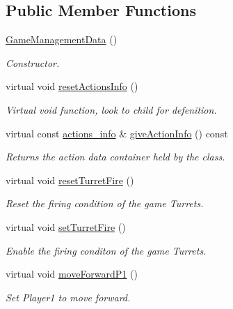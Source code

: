 \subsection*{Public Member Functions}
\begin{DoxyCompactItemize}
\item 
\hyperlink{classGameManagementData_a62ed683d4e02da56bda0507892a72041}{Game\-Management\-Data} ()
\begin{DoxyCompactList}\small\item\em Constructor. \end{DoxyCompactList}\item 
virtual void \hyperlink{classGameManagementData_ae49afd739e313caf0b5cd3799be1b125}{reset\-Actions\-Info} ()
\begin{DoxyCompactList}\small\item\em Virtual void function, look to child for defenition. \end{DoxyCompactList}\item 
virtual const \hyperlink{structactions__info}{actions\-\_\-info} \& \hyperlink{classGameManagementData_afa213f0d90a9d0878fae317457f5e851}{give\-Action\-Info} () const 
\begin{DoxyCompactList}\small\item\em Returns the action data container held by the class. \end{DoxyCompactList}\item 
virtual void \hyperlink{classGameManagementData_a2e9acf1ddddabee775dc106b478aa2e2}{reset\-Turret\-Fire} ()
\begin{DoxyCompactList}\small\item\em Reset the firing condition of the game Turrets. \end{DoxyCompactList}\item 
virtual void \hyperlink{classGameManagementData_aa3e5f9aaa99a44c4518933ad75b7ccd6}{set\-Turret\-Fire} ()
\begin{DoxyCompactList}\small\item\em Enable the firing conditon of the game Turrets. \end{DoxyCompactList}\item 
virtual void \hyperlink{classGameManagementData_a4ad4fccb78261b8299142db3185828e3}{move\-Forward\-P1} ()
\begin{DoxyCompactList}\small\item\em Set Player1 to move forward. \end{DoxyCompactList}\item 

\end{DoxyCompactItemize}
